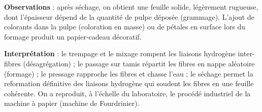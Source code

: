 \documentclass[11pt]{article}
\begin{document}
\begin{experience}
\textbf{Observations} : après séchage, on obtient une feuille solide, légèrement rugueuse, dont l'épaisseur dépend de la quantité de pulpe déposée (grammage). L'ajout de colorants dans la pulpe (coloration en masse) ou de pétales en surface lors du formage produit un papier-cadeau décoratif.

\textbf{Interprétation} : le trempage et le mixage rompent les liaisons hydrogène inter-fibres (désagrégation) ; le passage sur tamis répartit les fibres en nappe aléatoire (formage) ; le pressage rapproche les fibres et chasse l'eau ; le séchage permet la reformation définitive des liaisons hydrogène qui soudent les fibres en une feuille cohérente. On a reproduit, à l'échelle du laboratoire, le procédé industriel de la machine à papier (machine de Fourdrinier).
\end{experience}
\end{document}
